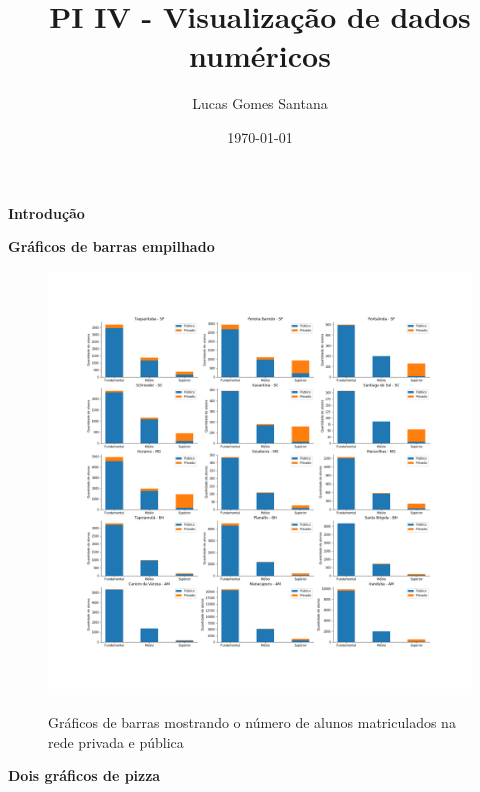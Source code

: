 \documentclass[12pt]{article}
\title{PI IV - Visualização de dados numéricos}
\author{Lucas Gomes Santana}
\date{\today}
\begin{document}
\maketitle

\newpage
\textbf{\Large Introdução}\par

\newpage
\textbf{\Large Gráficos de barras empilhado}\par


\setcounter{figure}{0}
\begin{figure}[H]
\centering
\includegraphics[width = 1\textwidth]{bar.png}
\label{fig:A.1}
\caption{Gráficos de barras mostrando o número de alunos matriculados na rede privada e pública}
\end{figure}

\newpage
\textbf{\Large Dois gráficos de pizza}\par
\end{document}
